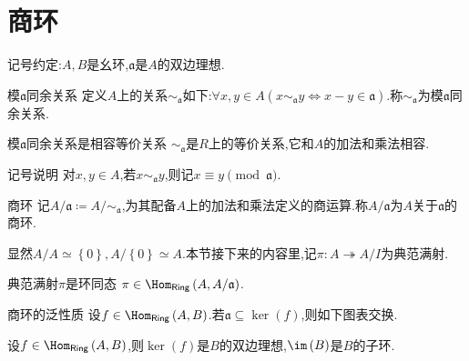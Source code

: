 \section{商环}

记号约定:$A,B$是幺环,$\mathfrak{a}$是$A$的双边理想.

\begin{definition}{模$\mathfrak{a}$同余关系}{}
	定义$A$上的关系$\sim_{\mathfrak{a}}$如下:$\forall x,y\in A\left(x\sim_{\mathfrak{a}} y\iff x-y\in\mathfrak{a}\right)$.称$\sim_{\mathfrak{a}}$为模$\mathfrak{a}$同余关系.
\end{definition}

\begin{proposition}{模$\mathfrak{a}$同余关系是相容等价关系}{}
	$\sim_{\mathfrak{a}}$是$R$上的等价关系,它和$A$的加法和乘法相容.
\end{proposition}

\begin{remark}{记号说明}{}
	对$x,y\in A$,若$x\sim_{\mathfrak{a}}y$,则记$x\equiv y\pmod{\mathfrak{a}}$.
\end{remark}

\begin{definition}{商环}{}
	记$A/\mathfrak{a}\coloneq A/\sim_{\mathfrak{a}}$,为其配备$A$上的加法和乘法定义的商运算.称$A/\mathfrak{a}$为$A$关于$\mathfrak{a}$的商环.
\end{definition}

显然$A/A\simeq\left\{0\right\},A/\left\{0\right\}\simeq A$.本节接下来的内容里,记$\pi:A\twoheadrightarrow A/I$为典范满射.

\begin{proposition}{典范满射$\pi$是环同态}{}
	$\pi\in\Hom_{\mathsf{Ring}}\left(A,A/\mathfrak{a}\right)$.
\end{proposition}

\begin{theorem}{商环的泛性质}{}
	设$f\in\Hom_{\mathsf{Ring}}\left(A,B\right)$.若$\mathfrak{a}\subseteq\ker\left(f\right)$,则如下图表交换.
	\begin{center}
	\end{center}
\end{theorem}

\begin{proposition}{}{}
	设$f\in\Hom_{\mathsf{Ring}}\left(A,B\right)$,则$\ker\left(f\right)$是$B$的双边理想,$\im\left(B\right)$是$B$的子环.
\end{proposition}

